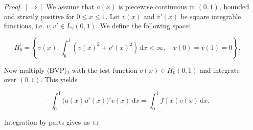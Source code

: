 \documentclass[12pt, a4paper]{article}
\newcommand{\rd}{\ensuremath{\mathrm{d}}}
\newcommand{\id}{\ensuremath{\,\rd}}
\numberwithin{equation}{section}
\begin{document}
\begin{proof}
$[ \Rightarrow ]$ We assume that $a(x)$ is piecewise continuous in $(0,1)$, bounded and strictly positive for $0\leq x \leq 1$. Let $v(x)$ and $v'(x)$ be square integrable functions, i.e. $v, v' \in L_2(0,1)$. We define the following space:

\begin{equation*}
H_0^1 = \left\{ v(x) : \int_0^1 ( v(x)^2 + v'(x)^2 ) \id x < \infty, \quad v(0) = v(1) = 0 \right\}.
\end{equation*}

\noindent Now multiply (BVP)$_1$ with the test function $v(x)\in H_0^1(0,1)$ and integrate over $(0,1)$. This yields

\begin{equation*}
-\int_0^1 \big( a(x)u'(x) \big)' v(x) \id x = \int_0^1 f(x)v(x) \id x.
\end{equation*}

\noindent Integration by parts gives us


\end{proof}
\end{document}

